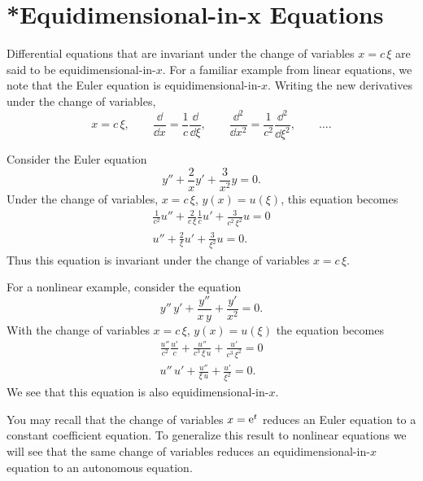 \section{*Equidimensional-in-x Equations}

Differential equations that are invariant under the change of variables
$x = c\,\xi$
are said to be equidimensional-in-$x$.  
For a familiar example from linear equations, we note that 
the Euler equation is 
equidimensional-in-$x$.  Writing the new derivatives under the change of 
variables,
\[ x = c\,\xi, \qquad \frac{\dd}{\dd x} = \frac{1}{c} \frac{\dd}{\dd \xi}, \qquad
\frac{\dd^2}{\dd x^2} = \frac{1}{c^2}\frac{\dd^2}{\dd \xi^2}, \qquad \ldots.\]




\begin{Example}
  Consider the Euler equation
  \[ y'' + \frac{2}{x} y' + \frac{3}{x^2}y = 0.\]
  Under the change of variables, $x = c\,\xi$, $y(x) = u(\xi)$,
  this equation becomes
  \begin{gather*}
    \frac{1}{c^2} u'' + \frac{2}{c\,\xi} \frac{1}{c}u'
    + \frac{3}{c^2\,\xi^2} u = 0 \\
    u'' + \frac{2}{\xi} u' + \frac{3}{\xi^2}u = 0.
  \end{gather*}
  Thus this equation is invariant under the change of variables $x = c\,\xi$.
\end{Example}



\begin{Example} \label{nonlin_equidim}
  For a nonlinear example, consider the equation
  \[ y''\,y' + \frac{y''}{x\,y}+ \frac{y'}{x^2} = 0.\]
  With the change of variables $x = c\,\xi$, $y(x) = u(\xi)$
  the equation becomes
  \begin{gather*}
    \frac{u''}{c^2}\frac{u'}{c} + \frac{u''}{c^3\,\xi\,u} 
    + \frac{u'}{c^3\,\xi^2} = 0 \\
    u''\,u' + \frac{u''}{\xi\,u} 
    + \frac{u'}{\xi^2} = 0.
  \end{gather*}
  We see that this equation is also equidimensional-in-$x$.
\end{Example}




You may recall that the change of variables $x = \mathop{\mathrm{e}}\nolimits^t$ reduces an Euler
equation to a constant coefficient equation. 
To generalize this result to nonlinear equations we will see that the
same change of variables reduces an equidimensional-in-$x$ equation to
an autonomous equation.

